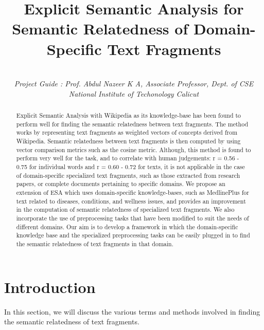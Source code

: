 \documentclass[journal,transmag]{IEEEtran}
\begin{document}
\title{Explicit Semantic Analysis for Semantic Relatedness of Domain-Specific Text Fragments}

\author{
    \\
   \emph{Project Guide : Prof. Abdul Nazeer K A, Associate Professor, Dept. of CSE\\National Institute of Techonology Calicut}
}

\maketitle

\begin{abstract}
Explicit Semantic Analysis with Wikipedia as its knowledge-base has been found to perform well for finding the semantic relatedness between text fragments. The method works by representing text fragments as weighted vectors of concepts derived from Wikipedia. Semantic relatedness between text fragments is then computed by using vector comparison metrics such as the cosine metric. Although, this method is found to perform very well for the task, and to correlate with human judgements: r = 0.56 - 0.75 for individual words and r = 0.60 - 0.72 for texts, it is not applicable in the case of domain-specific specialized text fragments, such as those extracted from research papers, or complete documents pertaining to specific domains. We propose an extension of ESA which uses domain-specific knowledge-bases, such as MedlinePlus for text related to diseases, conditions, and wellness issues, and provides an improvement in the computation of semantic relatedness of specialized text fragments. We also incorporate the use of preprocessing tasks that have been modified to suit the needs of different domains. Our aim is to develop a framework in which the domain-specific knowledge base and the specialized preprocessing tasks can be easily plugged in to find the semantic relatedness of text fragments in that domain.
\end{abstract}

\section{\textbf{Introduction}}
In this section, we will discuss the various terms and methods involved in finding the semantic relatedness of text fragments.
\end{document}
